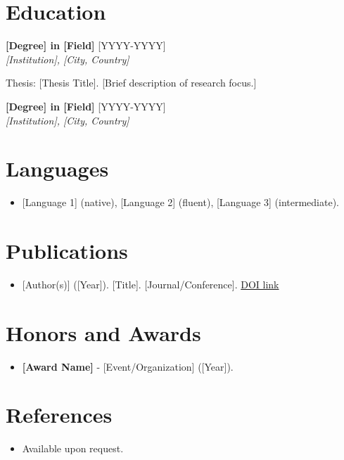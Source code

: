 \documentclass[11pt,a4paper,sans]{moderncv}
\begin{document}
\section{Education}
\vspace{1pt}

\noindent\textbf{[Degree] in [Field]} \hfill \textcolor{color1}{[YYYY-YYYY]}\\
\textit{[Institution], [City, Country]}\par
Thesis: [Thesis Title]. [Brief description of research focus.]

\vspace{3pt}

\noindent\textbf{[Degree] in [Field]} \hfill \textcolor{color1}{[YYYY-YYYY]}\\
\textit{[Institution], [City, Country]}\par
[Brief description or key topics.]


\section{Languages}
\vspace{1pt}
\begin{itemize}
\item{} [Language 1] (native), [Language 2] (fluent), [Language 3] (intermediate).
\end{itemize}


\section{Publications}
\vspace{1pt}
\begin{itemize}
\item{} [Author(s)] ([Year]). [Title]. [Journal/Conference]. \href{[DOI_URL]}{DOI link}
\end{itemize}


\section{Honors and Awards}
\vspace{1pt}
\begin{itemize}
\item{\textbf{[Award Name]} - [Event/Organization] ([Year]).}
\end{itemize}


\section{References}
\vspace{1pt}
\begin{itemize}
\item{Available upon request.}
\end{itemize}
\end{document}
